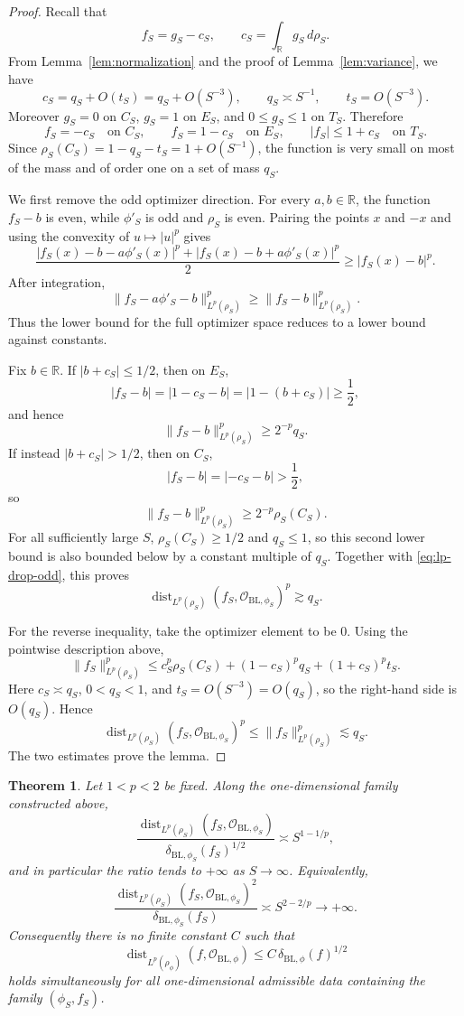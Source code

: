 \documentclass[11pt]{amsart}
\newtheorem{theorem}{Theorem}[section]
\theoremstyle{remark}
\DeclareMathOperator{\dist}{dist}
\newcommand{\R}{\mathbb R}
\newcommand{\cO}{\mathcal O}
\newcommand{\BL}{\mathrm{BL}}
\begin{document}
\begin{proof}
Recall that
\[
  f_S=g_S-c_S,
  \qquad
  c_S=\int_{\R}g_S\,d\rho_S.
\]
From Lemma~\ref{lem:normalization} and the proof of
Lemma~\ref{lem:variance}, we have
\[
  c_S=q_S+O(t_S)=q_S+O(S^{-3}),
  \qquad
  q_S\asymp S^{-1},
  \qquad
  t_S=O(S^{-3}).
\]
Moreover $g_S=0$ on $C_S$, $g_S=1$ on $E_S$, and $0\le g_S\le 1$ on $T_S$.
Therefore
\[
  f_S=-c_S \quad\text{on } C_S,
  \qquad
  f_S=1-c_S \quad\text{on } E_S,
  \qquad
  |f_S|\le 1+c_S \quad\text{on } T_S.
\]
Since $\rho_S(C_S)=1-q_S-t_S=1+O(S^{-1})$, the function is very small on most
of the mass and of order one on a set of mass $q_S$.

We first remove the odd optimizer direction. For every $a,b\in\R$, the
function $f_S-b$ is even, while $\phi'_S$ is odd and $\rho_S$ is even. Pairing
the points $x$ and $-x$ and using the convexity of $u\mapsto |u|^p$ gives
\[
  \frac{|f_S(x)-b-a\phi'_S(x)|^p
        +|f_S(x)-b+a\phi'_S(x)|^p}{2}
  \ge |f_S(x)-b|^p.
\]
After integration,
\begin{equation}\label{eq:lp-drop-odd}
  \|f_S-a\phi'_S-b\|_{L^p(\rho_S)}^p
  \ge
  \|f_S-b\|_{L^p(\rho_S)}^p.
\end{equation}
Thus the lower bound for the full optimizer space reduces to a lower bound
against constants.

Fix $b\in\R$. If $|b+c_S|\le 1/2$, then on $E_S$,
\[
  |f_S-b|=|1-c_S-b|=|1-(b+c_S)|\ge \frac12,
\]
and hence
\[
  \|f_S-b\|_{L^p(\rho_S)}^p\ge 2^{-p}q_S.
\]
If instead $|b+c_S|>1/2$, then on $C_S$,
\[
  |f_S-b|=|-c_S-b|>\frac12,
\]
so
\[
  \|f_S-b\|_{L^p(\rho_S)}^p
  \ge 2^{-p}\rho_S(C_S).
\]
For all sufficiently large $S$, $\rho_S(C_S)\ge 1/2$ and $q_S\le 1$, so this
second lower bound is also bounded below by a constant multiple of $q_S$.
Together with \eqref{eq:lp-drop-odd}, this proves
\[
  \dist_{L^p(\rho_S)}(f_S,\cO_{\BL,\phi_S})^p\gtrsim q_S.
\]

For the reverse inequality, take the optimizer element to be $0$. Using the
pointwise description above,
\[
  \|f_S\|_{L^p(\rho_S)}^p
  \le
  c_S^p\rho_S(C_S)+(1-c_S)^pq_S+(1+c_S)^pt_S.
\]
Here $c_S\asymp q_S$, $0<q_S<1$, and $t_S=O(S^{-3})=O(q_S)$, so the right-hand
side is $O(q_S)$. Hence
\[
  \dist_{L^p(\rho_S)}(f_S,\cO_{\BL,\phi_S})^p
  \le
  \|f_S\|_{L^p(\rho_S)}^p
  \lesssim q_S.
\]
The two estimates prove the lemma.
\end{proof}

\begin{theorem}\label{thm:lp-failure-1d}
Let $1<p<2$ be fixed. Along the one-dimensional family constructed above,
\[
  \frac{\dist_{L^p(\rho_S)}(f_S,\cO_{\BL,\phi_S})}
       {\delta_{\BL,\phi_S}(f_S)^{1/2}}
  \asymp S^{1-1/p},
\]
and in particular the ratio tends to $+\infty$ as $S\to\infty$. Equivalently,
\[
  \frac{\dist_{L^p(\rho_S)}(f_S,\cO_{\BL,\phi_S})^2}
       {\delta_{\BL,\phi_S}(f_S)}
  \asymp S^{2-2/p}\to+\infty.
\]
Consequently there is no finite constant $C$ such that
\[
  \dist_{L^p(\rho_\phi)}(f,\cO_{\BL,\phi})
  \le C\,\delta_{\BL,\phi}(f)^{1/2}
\]
holds simultaneously for all one-dimensional admissible data containing the
family $(\phi_S,f_S)$.
\end{theorem}
\end{document}
